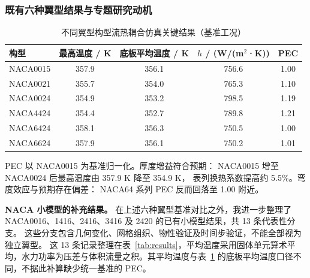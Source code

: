 \documentclass[stage2,fontset=fandol]{ydzjreport}
\begin{document}
\subsubsection{既有六种翼型结果与专题研究动机}

\begin{table}[H]
\centering
\caption{不同翼型构型流热耦合仿真关键结果（基准工况）}
\label{tab:airfoil}
\begin{tabularx}{\textwidth}{@{}l c c c c@{}}
\toprule
\rowcolor{ydzjlight} 构型 & 最高温度 / K & 底板平均温度 / K & $h$ / (W/(m$^2$·K)) & PEC \\
\midrule
NACA0015 & 357.9 & 356.1 & 756.6 & 1.00 \\
NACA0021 & 355.7 & 354.0 & 765.3 & 1.10 \\
NACA0024 & 354.9 & 353.2 & 798.5 & 1.19 \\
NACA4424 & 354.4 & 352.7 & 789.8 & 1.21 \\
NACA6424 & 358.1 & 356.3 & 750.5 & 1.00 \\
NACA6624 & 357.9 & 356.1 & 750.2 & 1.01 \\
\bottomrule
\end{tabularx}
\end{table}

PEC 以 NACA0015 为基准归一化。厚度增益符合预期：
NACA0015 增至 NACA0024 后最高温度由 357.9 K 降至 354.9 K，
表列换热系数提高约 5.5\%。弯度效应与预期存在偏差：
NACA64 系列 PEC 反而回落至 1.00 附近。


\textbf{NACA 小模型的补充结果。}
在上述六种翼型基准对比之外，我进一步整理了 NACA0016、1416、2416、3416
及 2420 的已有小模型结果，共 13 条代表性分支。
这些分支包含几何变化、网格组织、物性验证及时间步验证，不能全部视为独立翼型。
这 13 条记录整理在表~\ref{tab:results}，平均温度采用固体单元算术平均，水力功率为压差与体积流量之积。其平均温度与表~\ref{tab:airfoil} 的底板平均温度口径不同，不据此补算缺少统一基准的 PEC。
\end{document}
